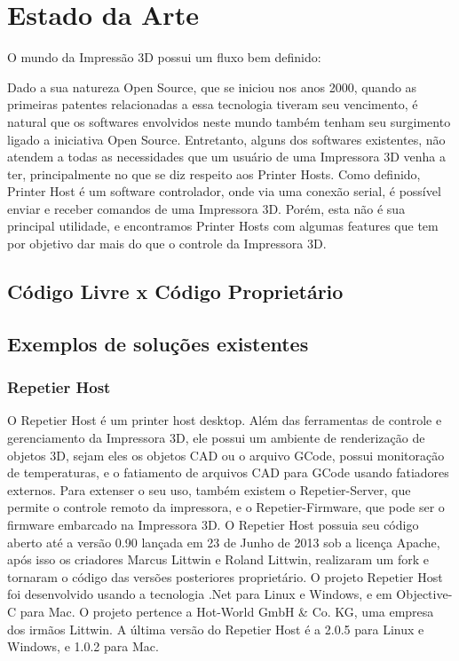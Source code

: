 \section{Estado da Arte}
O mundo da Impressão 3D possui um fluxo bem definido: 



Dado a sua natureza Open Source, que se iniciou nos anos 2000, quando as primeiras patentes relacionadas a essa tecnologia tiveram seu vencimento, é natural que os softwares envolvidos neste mundo também tenham seu surgimento ligado a iniciativa Open Source.
Entretanto, alguns dos softwares existentes, não atendem a todas as necessidades que um usuário de uma Impressora 3D venha a ter, principalmente no que se diz respeito aos Printer Hosts.
Como definido, Printer Host é um software controlador, onde via uma conexão serial, é possível enviar e receber comandos de uma Impressora 3D. Porém, esta não é sua principal utilidade, e encontramos Printer Hosts com algumas features que tem por objetivo dar mais do que o controle da Impressora 3D.

\subsection{Código Livre x Código Proprietário}

\subsection{Exemplos de soluções existentes}

\subsubsection{Repetier Host}
O Repetier Host é um printer host desktop. Além das
ferramentas de controle e gerenciamento da Impressora 3D, ele 
possui um ambiente de renderização de objetos 3D, sejam eles 
os objetos CAD ou o arquivo GCode, possui monitoração de 
temperaturas, e o fatiamento de arquivos CAD para GCode 
usando fatiadores externos. Para extenser o seu uso, também 
existem o Repetier-Server, que permite o controle remoto da 
impressora, e o Repetier-Firmware, que pode ser o firmware 
embarcado na Impressora 3D. O Repetier Host possuia seu 
código aberto até a versão 0.90 lançada em 23 de Junho de 
2013 sob a licença Apache, após isso os criadores Marcus 
Littwin e Roland Littwin, realizaram um fork e tornaram o 
código das versões posteriores proprietário. O projeto 
Repetier Host foi desenvolvido usando a tecnologia .Net para Linux e Windows, e em Objective-C para Mac. O projeto pertence a Hot-World GmbH \& Co. KG, uma empresa dos 
irmãos Littwin. A última versão do Repetier Host é a 2.0.5 
para Linux e Windows, e 1.0.2 para Mac.
\iffalse
Referências:
- 0.90 codigo: https://github.com/repetier/Repetier-Host
- Licença: https://github.com/repetier/Repetier-Host/blob/master/APACHE-LICENSE-2.0.txt
- Author: https://www.repetier.com/about-us/
- Versão: https://www.repetier.com/download-now/
\fi

